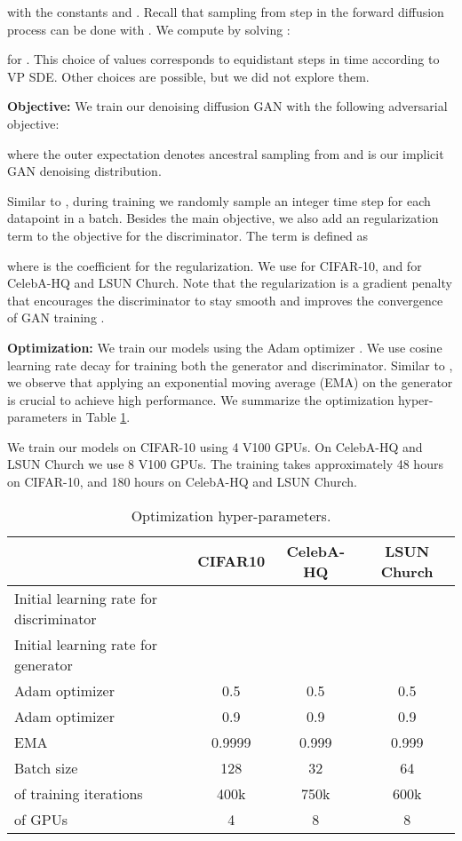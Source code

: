 with the constants  and . Recall that sampling from  step in the forward diffusion process can be done with .
We compute  by solving :

for . This choice of  values corresponds to equidistant steps in time according to VP SDE. Other choices are possible, but we did not explore them.

\textbf{Objective: }We train our denoising diffusion GAN with the following adversarial objective:
\iffalse

\fi

where the outer expectation denotes ancestral sampling from  and  is our implicit GAN denoising distribution.


Similar to \citet{ho2020denoising}, during training we randomly sample an integer time step  for each datapoint in a batch. Besides the main objective, we also add an  regularization term \citep{mescheder2018training} to the objective for the discriminator. The  term is defined as

where  is the coefficient for the regularization. We use  for CIFAR-10, and  for CelebA-HQ and LSUN Church. Note that the  regularization is a gradient penalty that encourages the discriminator to stay smooth and improves the convergence of GAN training \citep{mescheder2018training}. 


\textbf{Optimization: }We train our models using the Adam optimizer \citep{kingma2015adam}. We use cosine learning rate decay \citep{loshchilov2016sgdr} for training both the generator and discriminator. Similar to \citet{ho2020denoising, song2020score, karras2020training}, we observe that applying an exponential moving average (EMA) on the generator is crucial to achieve high performance. We summarize the optimization hyper-parameters in Table \ref{table optimizer}. 

We train our models on CIFAR-10 using 4 V100 GPUs. On CelebA-HQ and LSUN Church we use 8 V100 GPUs. The training takes approximately 48 hours on CIFAR-10, and 180 hours on CelebA-HQ and LSUN Church. 


\begin{table}
\centering
\caption{Optimization hyper-parameters.}
\label{table optimizer}
\begin{tabular}{lccc}
\toprule
& CIFAR10 & CelebA-HQ & LSUN Church 
\\ \midrule
Initial learning rate for discriminator &&  & \\
Initial learning rate for generator &&  & \\
Adam optimizer  &0.5&0.5& 0.5\\
Adam optimizer  &0.9&0.9&0.9\\
EMA &0.9999&0.999&0.999\\
Batch size &128&32&64\\
 of training iterations &400k&750k&600k\\
 of GPUs &4&8&8\\
\bottomrule
\end{tabular}
\end{table}

